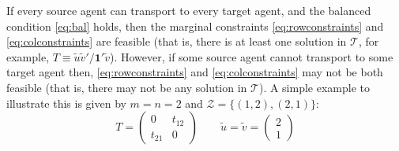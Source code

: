 \documentclass[twocolumn]{article}
\begin{document}
If every source agent can transport to every target agent,  and the balanced condition \eqref{eq:bal} holds, then the marginal constraints \eqref{eq:rowconstraints} and \eqref{eq:colconstraints} are feasible (that is,  there is at least one solution in $\mathcal{T}$, for example, 
$T \equiv  \tilde{u}\tilde{v}'/{\bm 1}'\tilde{v}$).
 However, if some  source agent cannot transport to some target agent
 then, \eqref{eq:rowconstraints} and \eqref{eq:colconstraints}  may not be both feasible (that is, there may not be any solution in $\mathcal{T}$). A simple example to illustrate this is given  by  $m=n=2$ and  $\mathcal{Z} = \{(1,2),(2,1)\}$: 
\begin{equation}
T=\left(\begin{array}{cc}
0 & t_{12} \\
 t_{21} & 0
\end{array}
\right)
\qquad  \tilde{u} = 
 \tilde{v} =\left(\begin{array}{c} 2\\ 1
\end{array}
\right)
\label{eq:exsimple}
\end{equation}
\end{document}
